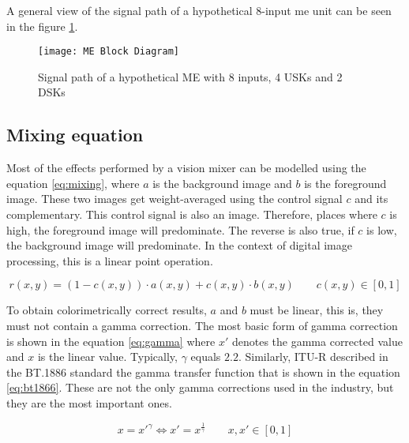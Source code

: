 \documentclass[../main.tex]{subfiles}
\begin{document}
A general view of the signal path of a hypothetical 8-input \gls{me} unit can be seen in the figure \ref{fig:02:me_signal_path}.\newline

\begin{landscape}
\begin{figure}[htbp]
    \centering
    \texttt{[image: ME Block Diagram]}

    \caption{Signal path of a hypothetical ME with 8 inputs, 4 USKs and 2 DSKs}
    \label{fig:02:me_signal_path}
\end{figure}
\end{landscape}

\subsection{Mixing equation}
Most of the effects performed by a vision mixer can be modelled using the equation \eqref{eq:mixing}, where $a$ is the background image and $b$ is the foreground image. These two images get weight-averaged using the control signal $c$ and its complementary. This control signal is also an image. Therefore, places where $c$ is high, the foreground image will predominate. The reverse is also true, if $c$ is low, the background image will predominate. In the context of digital image processing, this is a linear point operation.

\begin{equation} \label{eq:mixing}
    r(x, y) = (1 - c(x, y))  \cdot a(x, y) + c(x, y) \cdot b(x, y) \qquad c(x, y) \in [0, 1]
\end{equation}

To obtain colorimetrically correct results, $a$ and $b$ must be linear, this is, they must not contain a gamma correction. The most basic form of gamma correction is shown in the equation \eqref{eq:gamma} where $x'$ denotes the gamma corrected value and $x$ is the linear value. Typically, $\gamma$ equals $2.2$. Similarly, ITU-R described in the BT.1886 standard\cite{bt1886} the gamma transfer function that is shown in the equation \eqref{eq:bt1866}. These are not the only gamma corrections used in the industry, but they are the most important ones.\newline

\begin{equation} \label{eq:gamma}
    x = x'^{\gamma} \Longleftrightarrow x' = x^{\frac{1}{\gamma}} \qquad x, x' \in [0, 1]
\end{equation}
\end{document}
